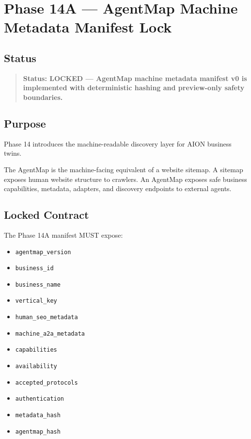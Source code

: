 \section{Phase 14A --- AgentMap Machine Metadata Manifest Lock}
\label{sec:phase14-agentmap-manifest-lock}

\subsection{Status}

\begin{quote}
\textbf{Status: LOCKED --- AgentMap machine metadata manifest v0 is implemented with deterministic hashing and preview-only safety boundaries.}
\end{quote}

\subsection{Purpose}

Phase 14 introduces the machine-readable discovery layer for AION business twins.

The AgentMap is the machine-facing equivalent of a website sitemap. A sitemap exposes human website structure to crawlers. An AgentMap exposes safe business capabilities, metadata, adapters, and discovery endpoints to external agents.

\subsection{Locked Contract}

The Phase 14A manifest MUST expose:

\begin{itemize}
  \item \texttt{agentmap\_version}
  \item \texttt{business\_id}
  \item \texttt{business\_name}
  \item \texttt{vertical\_key}
  \item \texttt{human\_seo\_metadata}
  \item \texttt{machine\_a2a\_metadata}
  \item \texttt{capabilities}
  \item \texttt{availability}
  \item \texttt{accepted\_protocols}
  \item \texttt{authentication}
  \item \texttt{metadata\_hash}
  \item \texttt{agentmap\_hash}
\end{itemize}

